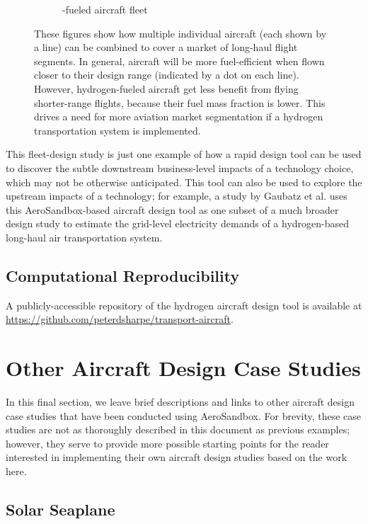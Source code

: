 \begin{figure}[h]
\begin{subfigure}[b]{0.49\textwidth}
        \caption{\textbf{\lh}-fueled aircraft fleet}
        \label{fig:design_space_kerosene}
    \end{subfigure}
    \caption{These figures show how multiple individual aircraft (each shown by a line) can be combined to cover a market of long-haul flight segments. In general, aircraft will be more fuel-efficient when flown closer to their design range (indicated by a dot on each line). However, hydrogen-fueled aircraft get less benefit from flying shorter-range flights, because their fuel mass fraction is lower. This drives a need for more aviation market segmentation if a hydrogen transportation system is implemented.}
    \label{fig:market_segmentation}
\end{figure}

This fleet-design study is just one example of how a rapid design tool can be used to discover the subtle downstream business-level impacts of a technology choice, which may not be otherwise anticipated. This tool can also be used to explore the upstream impacts of a technology; for example, a study by Gaubatz et al. \cite{gaubatz_estimating_2023} uses this AeroSandbox-based aircraft design tool as one subset of a much broader design study to estimate the grid-level electricity demands of a hydrogen-based long-haul air transportation system.

\subsection{Computational Reproducibility}

A publicly-accessible repository of the hydrogen aircraft design tool is available at \url{https://github.com/peterdsharpe/transport-aircraft}.


\section{Other Aircraft Design Case Studies}

In this final section, we leave brief descriptions and links to other aircraft design case studies that have been conducted using AeroSandbox. For brevity, these case studies are not as thoroughly described in this document as previous examples; however, they serve to provide more possible starting points for the reader interested in implementing their own aircraft design studies based on the work here.

\subsection{Solar Seaplane}
\label{sec:solar-seaplane}

